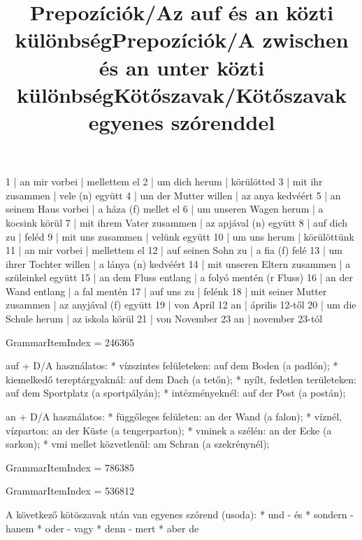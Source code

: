 \begin{exmp}
1 | an mir vorbei | mellettem el
2 | um dich herum | körülötted
3 | mit ihr zusammen | vele (n) együtt
4 | um der Mutter willen | az anya kedvéért
5 | an seinem Haus vorbei | a háza (f) mellet el
6 | um unseren Wagen herum | a kocsink körül
7 | mit ihrem Vater zusammen | az apjával (n) együtt
8 | auf dich zu | feléd
9 | mit uns zusammen | velünk együtt
10 | um uns herum | körülöttünk
11 | an mir vorbei | mellettem el
12 | auf seinen Sohn zu | a fia (f) felé
13 | um ihrer Tochter willen | a lánya (n) kedvéért
14 | mit unseren Eltern zusammen | a szüleinkel együtt
15 | an dem Fluss entlang | a folyó mentén (r Fluss)
16 | an der Wand entlang | a fal mentén
17 | auf uns zu | felénk
18 | mit seiner Mutter zusammen | az anyjával (f) együtt
19 | von April 12 an | április 12-től
20 | um die Schule herum | az iskola körül
21 | von November 23 an | november 23-tól
\end{exmp}

\title{Prepozíciók/Az auf és an közti különbség}

GrammarItemIndex = 246365

\begin{desc}
auf + D/A használatos:
* vízszintes felületeken: auf dem Boden (a padlón);
* kiemelkedő tereptárgyaknál: auf dem Dach (a tetőn);
* nyílt, fedetlen területeken: auf dem Sportplatz (a sportpályán);
* intézményeknél: auf der Post (a postán);

an + D/A használatos:
* függőleges felületen: an der Wand (a falon);
* víznél, vízparton: an der Küste (a tengerparton);
* vminek a szélén: an der Ecke (a sarkon);
* vmi mellet közvetlenül: am Schran (a szekrénynél);
\end{desc}

\begin{exmp}
\end{exmp}

\title{Prepozíciók/A zwischen és an unter közti különbség}

GrammarItemIndex = 786385

\begin{desc}
\end{desc}

\begin{exmp}
\end{exmp}

\title{Kötőszavak/Kötőszavak egyenes szórenddel}

GrammarItemIndex = 536812

\begin{desc}
A következő kötöszavak után van egyenes szórend (usoda):
* und - és
* sondern - hanem
* oder - vagy
* denn - mert
* aber  de
\end{desc}


